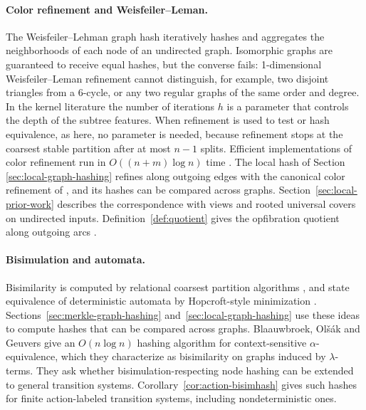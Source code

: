 \documentclass[twoside,leqno]{article}
\begin{document}
\paragraph{Color refinement and Weisfeiler--Leman.} The Weisfeiler--Lehman graph hash \cite{Shervashidze2011-dt} iteratively hashes and aggregates the neighborhoods of each node of an undirected graph. Isomorphic graphs are guaranteed to receive equal hashes, but the converse fails: 1-dimensional Weisfeiler--Leman refinement \cite{weisfeiler1968reduction} cannot distinguish, for example, two disjoint triangles from a $6$-cycle, or any two regular graphs of the same order and degree. In the kernel literature the number of iterations $h$ is a parameter that controls the depth of the subtree features. When refinement is used to test or hash equivalence, as here, no parameter is needed, because refinement stops at the coarsest stable partition after at most $n-1$ splits. Efficient implementations of color refinement run in $O((n+m)\log n)$ time \cite{cardon1982partitioning,berkholz2017tight}. The local hash of Section \ref{sec:local-graph-hashing} refines along outgoing edges with the canonical color refinement of \cite{berkholz2017tight}, and its hashes can be compared across graphs. Section~\ref{sec:local-prior-work} describes the correspondence with views and rooted universal covers on undirected inputs. Definition~\ref{def:quotient} gives the opfibration quotient along outgoing arcs \cite{boldi2002fibrations}.

\paragraph{Bisimulation and automata.} Bisimilarity is computed by relational coarsest partition algorithms \cite{kanellakis1990ccs,paige1987three}, and state equivalence of deterministic automata by Hopcroft-style minimization \cite{hopcraft,hopcraft-redescribe,valmari2008partial}. Sections~\ref{sec:merkle-graph-hashing} and~\ref{sec:local-graph-hashing} use these ideas to compute hashes that can be compared across graphs. Blaauwbroek, Ol\v{s}\'{a}k and Geuvers \cite{blaauwbroek2024hashing} give an $O(n\log n)$ hashing algorithm for context-sensitive $\alpha$-equivalence, which they characterize as bisimilarity on graphs induced by $\lambda$-terms. They ask whether bisimulation-respecting node hashing can be extended to general transition systems. Corollary~\ref{cor:action-bisimhash} gives such hashes for finite action-labeled transition systems, including nondeterministic ones.
\end{document}
